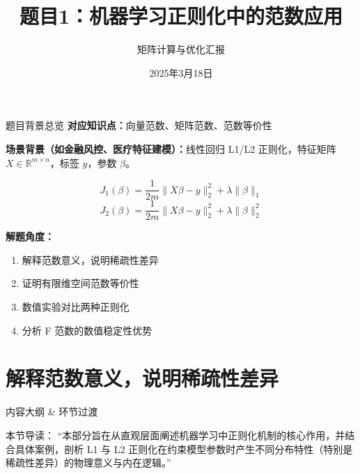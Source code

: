 \documentclass[aspectratio=169]{beamer}
\title{题目1：机器学习正则化中的范数应用}
\subtitle{矩阵计算与优化汇报}
\institute{第19组}
\date{2025年3月18日}
\begin{document}
\begin{frame}
    \titlepage
\end{frame}

\begin{frame}{题目背景总览}
    \textbf{对应知识点：}向量范数、矩阵范数、范数等价性
    \vspace{0.3cm}
    
    \textbf{场景背景（如金融风控、医疗特征建模）：}线性回归 L1/L2 正则化，特征矩阵 $X \in \mathbb{R}^{m \times n}$，标签 $y$，参数 $\beta$。
    
    $$J_1(\beta) = \frac{1}{2m} \|X\beta - y\|_2^2 + \lambda \|\beta\|_1$$
    $$J_2(\beta) = \frac{1}{2m} \|X\beta - y\|_2^2 + \lambda \|\beta\|_2^2$$
    
    \vspace{0.3cm}
    \textbf{解题角度：}
    \begin{enumerate}
        \item 解释范数意义，说明稀疏性差异
        \item 证明有限维空间范数等价性
        \item 数值实验对比两种正则化
        \item 分析 F 范数的数值稳定性优势
    \end{enumerate}
\end{frame}


\section{解释范数意义，说明稀疏性差异}

\begin{frame}{内容大纲 \& 环节过渡}
    \tableofcontents[currentsection]
    \vspace{0.5cm}
    \begin{block}{本节导读：}
        “本部分旨在从直观层面阐述机器学习中正则化机制的核心作用，并结合具体案例，剖析 L1 与 L2 正则化在约束模型参数时产生不同分布特性（特别是稀疏性差异）的物理意义与内在逻辑。”
    \end{block}
\end{frame}
\end{document}
